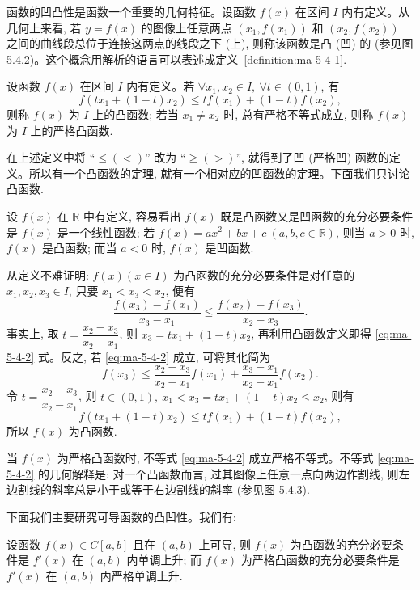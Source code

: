 函数的凹凸性是函数一个重要的几何特征。设函数 $f(x)$ 在区间 $I$ 内有定义。从几何上来看, 若 $y=f(x)$ 的图像上任意两点 $(x_1,f(x_1))$ 和 $(x_2,f(x_2))$ 之间的曲线段总位于连接这两点的线段之下 (上), 则称该函数是凸 (凹) 的 (参见图 5.4.2)。这个概念用解析的语言可以表述成定义~\ref{definition:ma-5-4-1}.

\begin{definition}\label{definition:ma-5-4-1}
设函数 $f(x)$ 在区间 $I$ 内有定义。若 $\forall x_1,x_2\in I,\ \forall t\in(0,1)$, 有
\[
  f(tx_1+(1-t)x_2)\leqslant tf(x_1)+(1-t)f(x_2),
\]
则称 $f(x)$ 为 $I$ 上的凸函数; 若当 $x_1\ne x_2$ 时, 总有严格不等式成立, 则称 $f(x)$ 为 $I$ 上的严格凸函数.
\end{definition}


\begin{remark}\label{remark:ma-5-source-123}
在上述定义中将 ``$\leqslant(<)$'' 改为 ``$\geqslant(>)$'', 就得到了凹 (严格凹) 函数的定义。所以有一个凸函数的定理, 就有一个相对应的凹函数的定理。下面我们只讨论凸函数.
\end{remark}

设 $f(x)$ 在 $\mathbb{R}$ 中有定义, 容易看出 $f(x)$ 既是凸函数又是凹函数的充分必要条件是 $f(x)$ 是一个线性函数; 若 $f(x)=ax^2+bx+c\ (a,b,c\in\mathbb{R})$, 则当 $a>0$ 时, $f(x)$ 是凸函数; 而当 $a<0$ 时, $f(x)$ 是凹函数.

从定义不难证明: $f(x)(x\in I)$ 为凸函数的充分必要条件是对任意的 $x_1,x_2,x_3\in I$, 只要 $x_1<x_3<x_2$, 便有
\begin{equation}
  \frac{f(x_3)-f(x_1)}{x_3-x_1}
  \leqslant
  \frac{f(x_2)-f(x_3)}{x_2-x_3}.
\label{eq:ma-5-4-2}
\end{equation}
事实上, 取 $t=\dfrac{x_2-x_3}{x_2-x_1}$, 则 $x_3=tx_1+(1-t)x_2$, 再利用凸函数定义即得 \eqref{eq:ma-5-4-2} 式。反之, 若 \eqref{eq:ma-5-4-2} 成立, 可将其化简为
\[
  f(x_3)\leqslant
  \frac{x_2-x_3}{x_2-x_1}f(x_1)
  +\frac{x_3-x_1}{x_2-x_1}f(x_2).
\]
令 $t=\dfrac{x_2-x_3}{x_2-x_1}$, 则 $t\in(0,1),\ x_1<x_3=tx_1+(1-t)x_2\leqslant x_2$, 则有
\[
  f(tx_1+(1-t)x_2)\leqslant tf(x_1)+(1-t)f(x_2),
\]
所以 $f(x)$ 为凸函数.

当 $f(x)$ 为严格凸函数时, 不等式 \eqref{eq:ma-5-4-2} 成立严格不等式。不等式 \eqref{eq:ma-5-4-2} 的几何解释是: 对一个凸函数而言, 过其图像上任意一点向两边作割线, 则左边割线的斜率总是小于或等于右边割线的斜率 (参见图 5.4.3).

下面我们主要研究可导函数的凸凹性。我们有:

\begin{theorem}\label{theorem:ma-5-4-4}
设函数 $f(x)\in C[a,b]$ 且在 $(a,b)$ 上可导, 则 $f(x)$ 为凸函数的充分必要条件是 $f'(x)$ 在 $(a,b)$ 内单调上升; 而 $f(x)$ 为严格凸函数的充分必要条件是 $f'(x)$ 在 $(a,b)$ 内严格单调上升.
\end{theorem}


